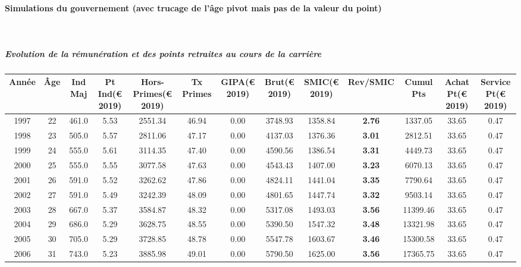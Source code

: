 \newpage 
 
\paragraph{Simulations du gouvernement (avec trucage de l'âge pivot mais pas de la valeur du point)}  ~\\ 
 
\subparagraph{Evolution de la rémunération et des points retraites au cours de la carrière} 
 
{ \scriptsize \begin{center} 
\begin{tabular}[htb]{|c|c||c|c|c|c|c|c||c|c||c|c|c||} 
\hline 
 Année &  Âge &  Ind Maj &  Pt Ind(\euro{} 2019) &   Hors-Primes(\euro{} 2019) &  Tx Primes &  GIPA(\euro{} 2019) &  Brut(\euro{} 2019) &  SMIC(\euro{} 2019) &  Rev/SMIC &  Cumul Pts &  Achat Pt(\euro{} 2019) &  Service Pt(\euro{} 2019) \\ 
\hline \hline 
 1997 &  22 &  461.0 &  5.53 &  2551.34 &  46.94 &  0.00 &  3748.93 &  1358.84 &  {\bf 2.76} &  1337.05 &  33.65 &  0.47 \\ 
\hline 
 1998 &  23 &  505.0 &  5.57 &  2811.06 &  47.17 &  0.00 &  4137.03 &  1376.36 &  {\bf 3.01} &  2812.51 &  33.65 &  0.47 \\ 
\hline 
 1999 &  24 &  555.0 &  5.61 &  3114.35 &  47.40 &  0.00 &  4590.56 &  1386.54 &  {\bf 3.31} &  4449.73 &  33.65 &  0.47 \\ 
\hline 
 2000 &  25 &  555.0 &  5.55 &  3077.58 &  47.63 &  0.00 &  4543.43 &  1407.00 &  {\bf 3.23} &  6070.13 &  33.65 &  0.47 \\ 
\hline 
 2001 &  26 &  591.0 &  5.52 &  3262.62 &  47.86 &  0.00 &  4824.11 &  1441.04 &  {\bf 3.35} &  7790.64 &  33.65 &  0.47 \\ 
\hline 
 2002 &  27 &  591.0 &  5.49 &  3242.39 &  48.09 &  0.00 &  4801.65 &  1447.74 &  {\bf 3.32} &  9503.14 &  33.65 &  0.47 \\ 
\hline 
 2003 &  28 &  667.0 &  5.37 &  3584.87 &  48.32 &  0.00 &  5317.08 &  1493.03 &  {\bf 3.56} &  11399.46 &  33.65 &  0.47 \\ 
\hline 
 2004 &  29 &  686.0 &  5.29 &  3628.75 &  48.55 &  0.00 &  5390.50 &  1547.32 &  {\bf 3.48} &  13321.98 &  33.65 &  0.47 \\ 
\hline 
 2005 &  30 &  705.0 &  5.29 &  3728.85 &  48.78 &  0.00 &  5547.78 &  1603.67 &  {\bf 3.46} &  15300.58 &  33.65 &  0.47 \\ 
\hline 
 2006 &  31 &  743.0 &  5.23 &  3885.98 &  49.01 &  0.00 &  5790.50 &  1625.00 &  {\bf 3.56} &  17365.75 &  33.65 &  0.47 \\ 

\end{tabular}
\end{center}}
